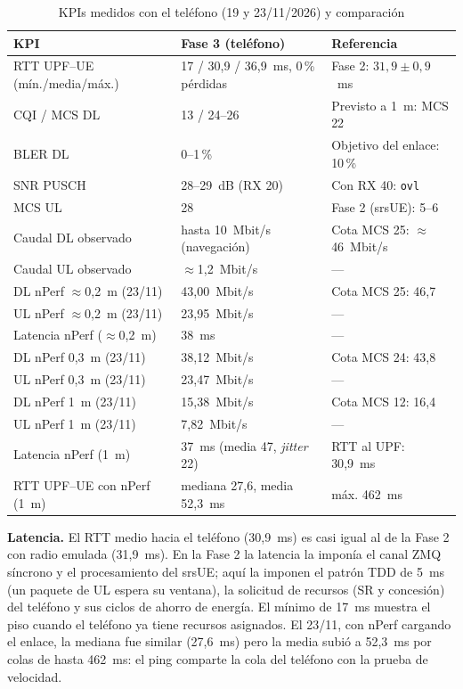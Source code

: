 \documentclass[conference]{IEEEtran}
\newcommand{\nperfping}{37~ms (media 47, \textit{jitter} 22)}
\begin{document}
\begin{table}[!t]
\caption{KPIs medidos con el teléfono (19 y 23/11/2026) y comparación}
\label{tab:kpi}
\centering
\footnotesize
\renewcommand{\arraystretch}{1.1}
\begin{tabular}{p{2.6cm}p{2.6cm}p{2.6cm}}
\toprule
\textbf{KPI} & \textbf{Fase 3 (teléfono)} & \textbf{Referencia} \\
\midrule
RTT UPF--UE (mín./media/máx.) & 17 / 30{,}9 / 36{,}9~ms, 0\,\% pérdidas & Fase 2: $31{,}9\pm0{,}9$~ms \\
CQI / MCS DL & 13 / 24--26 & Previsto a 1~m: MCS 22 \\
BLER DL & 0--1\,\% & Objetivo del enlace: 10\,\% \\
SNR PUSCH & 28--29~dB (RX 20) & Con RX 40: \texttt{ovl} \\
MCS UL & 28 & Fase 2 (srsUE): 5--6 \\
Caudal DL observado & hasta 10~Mbit/s (navegación) & Cota MCS 25: $\approx$46~Mbit/s \\
Caudal UL observado & $\approx$1{,}2~Mbit/s & --- \\
DL nPerf $\approx$0{,}2~m (23/11) & 43{,}00~Mbit/s & Cota MCS 25: 46{,}7 \\
UL nPerf $\approx$0{,}2~m (23/11) & 23{,}95~Mbit/s & --- \\
Latencia nPerf ($\approx$0{,}2~m) & 38~ms & --- \\
DL nPerf 0{,}3~m (23/11) & 38{,}12~Mbit/s & Cota MCS 24: 43{,}8 \\
UL nPerf 0{,}3~m (23/11) & 23{,}47~Mbit/s & --- \\
DL nPerf 1~m (23/11) & 15{,}38~Mbit/s & Cota MCS 12: 16{,}4 \\
UL nPerf 1~m (23/11) & 7{,}82~Mbit/s & --- \\
Latencia nPerf (1~m) & \nperfping & RTT al UPF: 30{,}9~ms \\
RTT UPF--UE con nPerf (1~m) & mediana 27{,}6, media 52{,}3~ms & máx. 462~ms \\
\bottomrule
\end{tabular}
\end{table}

\textbf{Latencia.} El RTT medio hacia el teléfono (30{,}9~ms) es casi igual al de la Fase 2 con radio emulada (31{,}9~ms). En la Fase 2 la latencia la imponía el canal ZMQ síncrono y el procesamiento del srsUE; aquí la imponen el patrón TDD de 5~ms (un paquete de UL espera su ventana), la solicitud de recursos (SR y concesión) del teléfono y sus ciclos de ahorro de energía. El mínimo de 17~ms muestra el piso cuando el teléfono ya tiene recursos asignados. El 23/11, con nPerf cargando el enlace, la mediana fue similar (27{,}6~ms) pero la media subió a 52{,}3~ms por colas de hasta 462~ms: el ping comparte la cola del teléfono con la prueba de velocidad.
\end{document}
